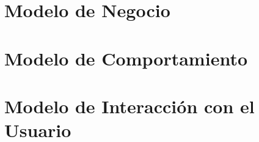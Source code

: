 \documentclass[10pt]{book}
\begin{document}
\chapter{Modelo de Negocio}\label{chp:modeloNegocios}
\chapter{Modelo de Comportamiento}
\chapter{Modelo de Interacción con el Usuario}


%    

    	




\renewcommand{\bibname}{Referencias}


\end{document}
